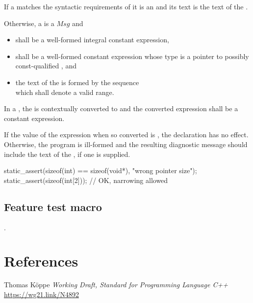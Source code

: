 \documentclass{wg21}
\begin{document}
\begin{addedblock}
\pnum

If a  matches the syntactic requirements of 
it is an  and its text is the text of the .

Otherwise, a  is a  $Msg$ and
\begin{itemize}
    \item {} shall be a well-formed integral constant expression,
    \item {} shall be a well-formed constant expression whose type is a pointer to possibly const-qualified , and
    \item the text of the  is formed by the sequence\\ \tcode{[$Msg$.data(), $Msg$.data() + $Msg$.size())} which shall denote a valid range.
\end{itemize}
\end{addedblock}

In a ,
the 
is contextually converted to  and
the converted expression shall be a constant expression.


If the value of the expression  when
so converted is , the declaration has no
effect.
Otherwise, the program is ill-formed and the resulting
diagnostic message should include the text of
the , if one is supplied.


\begin{example}
\begin{codeblock}
    static_assert(sizeof(int) == sizeof(void*), "wrong pointer size");
    static_assert(sizeof(int[2]));          // OK, narrowing allowed
\end{codeblock}
\end{example}



\subsection{Feature test macro}

.

\section{References}

\renewcommand{\section}[2]{}%



\begin{thebibliography}{9}

Thomas Köppe
\emph{Working Draft, Standard for Programming Language C++}\newline
\url{https://wg21.link/N4892}


\end{thebibliography}
\end{document}
